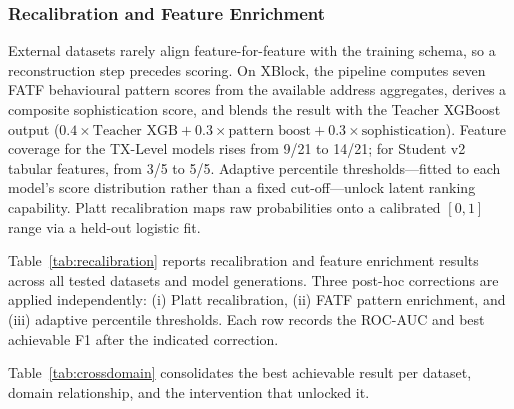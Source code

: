 \documentclass[journal]{IEEEtran}
\begin{document}
\subsubsection{Recalibration and Feature Enrichment}

External datasets rarely align feature-for-feature with the training schema, so a reconstruction step precedes scoring. On XBlock, the pipeline computes seven FATF behavioural pattern scores from the available address aggregates, derives a composite sophistication score, and blends the result with the Teacher XGBoost output ($0.4 \times \text{Teacher XGB} + 0.3 \times \text{pattern boost} + 0.3 \times \text{sophistication}$). Feature coverage for the TX-Level models rises from 9/21 to 14/21; for Student v2 tabular features, from 3/5 to 5/5. Adaptive percentile thresholds---fitted to each model's score distribution rather than a fixed cut-off---unlock latent ranking capability. Platt recalibration maps raw probabilities onto a calibrated $[0, 1]$ range via a held-out logistic fit.

Table~\ref{tab:recalibration} reports recalibration and feature enrichment results across all tested datasets and model generations. Three post-hoc corrections are applied independently: (i) Platt recalibration, (ii) FATF pattern enrichment, and (iii) adaptive percentile thresholds. Each row records the ROC-AUC and best achievable F1 after the indicated correction.

Table~\ref{tab:crossdomain} consolidates the best achievable result per dataset, domain relationship, and the intervention that unlocked it.
\end{document}
